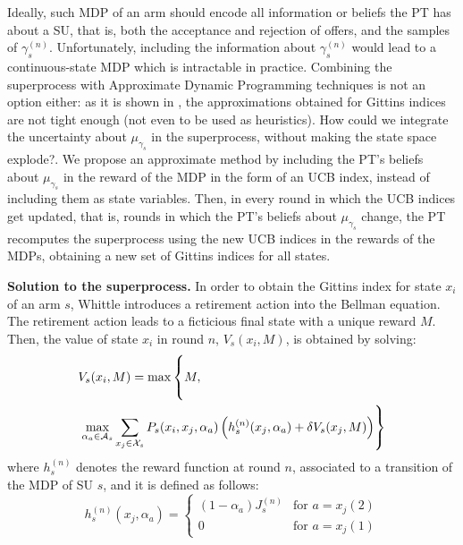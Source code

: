 Ideally, such MDP of an arm should encode all information or beliefs the PT has about a SU, that is, both the acceptance and rejection of offers, and the samples of $\gamma_s^{(n)}$. 
Unfortunately, including the information about $\gamma_s^{(n)}$ would lead to a continuous-state MDP which is intractable in practice. 
Combining the superprocess with Approximate Dynamic Programming techniques is not an option either: as it is shown in \cite{ref:Pandey2007}, the approximations obtained for Gittins indices are not tight enough (not even to be used as heuristics). How could we integrate the uncertainty about $\mu_{\gamma_s}$ in the superprocess, without making the state space explode?. We propose an approximate method by including the PT's beliefs about $\mu_{\gamma_s}$ in the reward of the MDP in the form of an UCB index, instead of including them as state variables. Then, in every round in which the UCB indices get updated, that is, rounds in which the PT's beliefs about $\mu_{\gamma_s}$ change, the PT recomputes the superprocess using the new UCB indices in the rewards of the MDPs, obtaining a new set of Gittins indices for all states.


\textbf{Solution to the superprocess.} In order to obtain the Gittins index for state $x_i$ of an arm $s$, Whittle introduces a retirement action into the Bellman equation.
The retirement action leads to a ficticious final state with a unique reward $M$. Then, the value of state $x_i$ in round $n$, $V_s(x_i,M)$, is obtained by solving:
\begin{equation}\label{eq:MDPret}
\begin{split}
&V_s(x_i,M) = \max\left\{M, \vphantom{ \sum_{x_{j}}}\right.\\
&\left.\max_{\alpha_a \in \mathcal{A}_s} \sum_{x_{j} \in \mathcal{X}_s} P_s(x_i,x_{j},\alpha_a)\left(h_s^{(n)}(x_{j},\alpha_a)+\delta V_s(x_{j},M)\right)\right\}
\end{split}
\end{equation}
where $h_s^{(n)}$ denotes the reward function at round $n$, associated to a transition of the MDP of SU $s$, and it is defined as follows:
\begin{equation}
h_s^{(n)}(x_{j},\alpha_a) = 
\begin{cases}
    (1 - \alpha_a) J_s^{(n)} & \text{for } a = x_j(2)\\
    0 & \text{for } a = x_j(1)
   \end{cases}
\end{equation}

